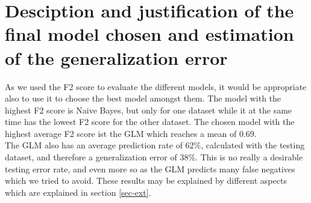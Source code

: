 
\section{Desciption and justification of the final model chosen and estimation of the generalization error}
As we used the F2 score to evaluate the different models, it would be appropriate also to use it to choose the best model amongst them. The model with the highest F2 score is Naive Bayes, but only for one dataset while it at the same time has the lowest F2 score for the other dataset. The chosen model with the highest average F2 score ist the GLM which reaches a mean of 0.69. \\
The GLM also has an average prediction rate of 62\%, calculated with the testing dataset, and therefore a generalization error of 38\%. This is no really a desirable testing error rate, and even more so as the GLM predicts many false negatives which we tried to avoid. These results may be explained by different aspects which are explained in section \ref{sec-ext}.

